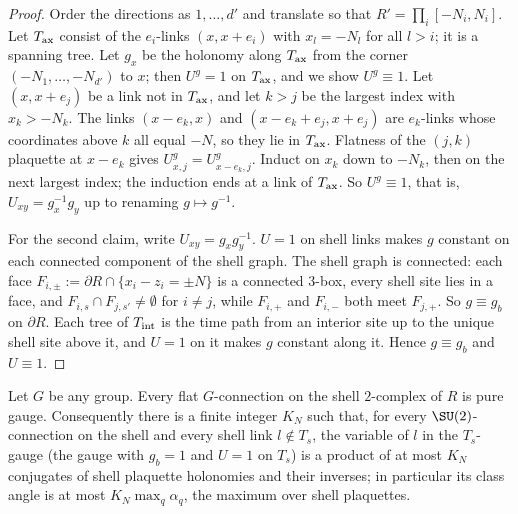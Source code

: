 \begin{proof}
Order the directions as $1,\dots,d'$ and translate so that $R'=\prod_i[-N_i,N_i]$. Let $T_{\rm ax}$ consist of the $e_i$-links $(x,x+e_i)$ with $x_l=-N_l$ for all $l>i$; it is a spanning tree. Let $g_x$ be the holonomy along $T_{\rm ax}$ from the corner $(-N_1,\dots,-N_{d'})$ to $x$; then $U^g=1$ on $T_{\rm ax}$, and we show $U^g\equiv1$. Let $(x,x+e_j)$ be a link not in $T_{\rm ax}$, and let $k>j$ be the largest index with $x_k>-N_k$. The links $(x-e_k,x)$ and $(x-e_k+e_j,x+e_j)$ are $e_k$-links whose coordinates above $k$ all equal $-N$, so they lie in $T_{\rm ax}$. Flatness of the $(j,k)$ plaquette at $x-e_k$ gives $U^g_{x,j}=U^g_{x-e_k,j}$. Induct on $x_k$ down to $-N_k$, then on the next largest index; the induction ends at a link of $T_{\rm ax}$. So $U^g\equiv1$, that is, $U_{xy}=g_x^{-1}g_y$ up to renaming $g\mapsto g^{-1}$.

For the second claim, write $U_{xy}=g_xg_y^{-1}$. $U=1$ on shell links makes $g$ constant on each connected component of the shell graph. The shell graph is connected: each face $F_{i,\pm}:=\partial R\cap\{x_i-z_i=\pm N\}$ is a connected $3$-box, every shell site lies in a face, and $F_{i,s}\cap F_{j,s'}\ne\emptyset$ for $i\ne j$, while $F_{i,+}$ and $F_{i,-}$ both meet $F_{j,+}$. So $g\equiv g_b$ on $\partial R$. Each tree of $T_{\rm int}$ is the time path from an interior site up to the unique shell site above it, and $U=1$ on it makes $g$ constant along it. Hence $g\equiv g_b$ and $U\equiv1$.
\end{proof}

\begin{lemma}\label{pf:lem-shell}
Let $G$ be any group. Every flat $G$-connection on the shell $2$-complex of $R$ is pure gauge. Consequently there is a finite integer $K_N$ such that, for every $\SU(2)$-connection on the shell and every shell link $l\notin T_s$, the variable of $l$ in the $T_s$-gauge (the gauge with $g_b=1$ and $U=1$ on $T_s$) is a product of at most $K_N$ conjugates of shell plaquette holonomies and their inverses; in particular its class angle is at most $K_N\max_q\alpha_q$, the maximum over shell plaquettes.
\end{lemma}

